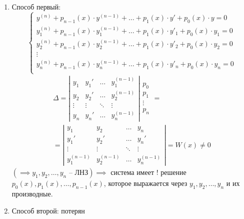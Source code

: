 \documentclass[11pt,a4paper,oneside]{report}
\theoremstyle{definition}
\theoremstyle{plain}
\theoremstyle{remark}
\begin{document}
\begin{enumerate}
    \item Способ первый:
          \begin{equation*}
              \left\{\begin{array}{l}
                  y^{(n)} + p_{n-1}(x)\cdot y^{(n-1)} + \ldots + p_1(x)\cdot y' + p_0(x)\cdot y = 0         \\
                  y^{(n)}_1 + p_{n-1}(x)\cdot y^{(n-1)}_1 + \ldots + p_1(x)\cdot y'_1 + p_0(x)\cdot y_1 = 0 \\
                  y^{(n)}_2 + p_{n-1}(x)\cdot y^{(n-1)}_2 + \ldots + p_1(x)\cdot y'_2 + p_0(x)\cdot y_2 = 0 \\
                  \vdots                                                                                    \\
                  y^{(n)}_n + p_{n-1}(x)\cdot y^{(n-1)}_n + \ldots + p_1(x)\cdot y'_n + p_0(x)\cdot y_n = 0 \\
              \end{array}\right.
          \end{equation*}
          \begin{multline*}
              \Delta = \left|\begin{array}{cccc}
                  y_1    & y_1'   & \ldots & y_1^{(n-1)} \\
                  y_2    & y_2'   & \ldots & y_2^{(n-1)} \\
                  \vdots & \vdots & \ddots & \vdots      \\
                  y_n    & y_n'   & \ldots & y_n^{(n-1)}
              \end{array}\right|\begin{array}{l}
                  p_0 \\ p_1 \\ \vdots \\ p_n
              \end{array} = \\
              = \left|\begin{array}{cccc}
                  y_1         & y_2         & \ldots & y_n         \\
                  y_1'        & y_2'        & \ldots & y_n'        \\
                  \vdots      & \vdots      & \ddots & \vdots      \\
                  y_1^{(n-1)} & y_2^{(n-1)} & \ldots & y_n^{(n-1)}
              \end{array}\right| = W(x) \ne 0
          \end{multline*}
          $(\implies y_1,y_2,\ldots,y_n\text{ -- ЛНЗ}) \implies$ система имеет $!$ решение \\ $p_0(x),p_1(x),\ldots,p_{n-1}(x)$, которое выражается через $y_1,y_2,\ldots,y_n$ и их производные.

    \item Способ второй: потерян
\end{enumerate}
\end{document}
